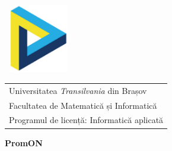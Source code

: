 
\begin{titlepage}
\flushleft
\includegraphics[width=3cm,height=3cm,keepaspectratio]{imagini/sigla.eps} %

\vspace*{-2.8cm}
\flushright
\begin{tabular}{l}
\Large{Universitatea \textit{Transilvania} din Brașov} \\
\Large{Facultatea de Matematică și Informatică}\\
\Large{Programul de licență: Informatică aplicată}
\end{tabular}

\vspace{4cm}

\begin{center}
\Huge{\textbf{PromON}}
\end{center}



\end{titlepage}


